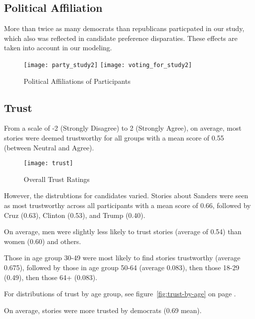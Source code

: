 \subsection{Political Affiliation}

More than twice as many democrats than republicans particpated in our study, which also was reflected in candidate preference disparaties. These effects are taken into account in our modeling.

\begin{figure}[H]  
\centering 
  \texttt{[image: party\_study2]} 
  \texttt{[image: voting\_for\_study2]}  
  \caption{Political Affiliations of Participants
    \label{fig:political2}}
\end{figure}

 
  


\newpage
\subsection{Trust}
From a scale of -2 (Strongly Disagree) to 2 (Strongly Agree), on average, most stories were deemed trustworthy for all groups with a mean score of 0.55 (between Neutral and Agree). 

\begin{figure}[H]  
\centering 
  \texttt{[image: trust]}  
  \caption{Overall Trust Ratings
    \label{fig:trust}}
\end{figure}

However, the distrubtions for candidates varied. Stories about Sanders were seen as most trustworthy across all participants with a mean score of 0.66, followed by Cruz (0.63), Clinton (0.53), and Trump (0.40).
 

On average, men were slightly less likely to trust stories (average of 0.54) than women (0.60) and others. 

Those in age group 30-49 were most likely to find stories trustworthy (average 0.675), followed by those in age group 50-64 (average 0.083), then those 18-29 (0.49), then those 64+ (0.083).

For distributions of trust by age group, see figure~\ref{fig:trust-by-age} on page \pageref{fig:trust-by-age}.

On average, stories were more trusted by democrats (0.69 mean).

